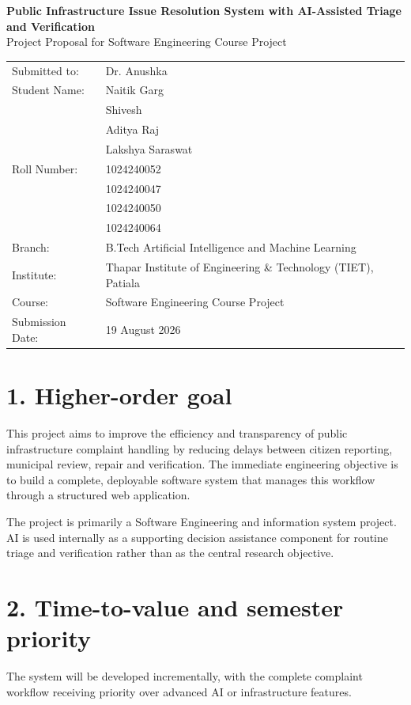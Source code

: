\documentclass[12pt,a4paper]{article}
\begin{document}
\begin{center}
{\Large\bfseries Public Infrastructure Issue Resolution System with AI-Assisted Triage and Verification}\\[6pt]
{\normalsize Project Proposal for Software Engineering Course Project}\\[12pt]
\begin{tabular}{@{}ll@{}}
Submitted to: & Dr. Anushka \\[2pt]
Student Name: & Naitik Garg \\ 
              & Shivesh \\
              & Aditya Raj \\
              & Lakshya Saraswat \\[2pt]
Roll Number:  & 1024240052 \\
              & 1024240047 \\
              & 1024240050 \\
              & 1024240064 \\[2pt]
Branch: & B.Tech Artificial Intelligence and Machine Learning \\[2pt]
Institute: & Thapar Institute of Engineering \& Technology (TIET), Patiala \\[2pt]
Course: & Software Engineering Course Project \\[2pt]
Submission Date: & 19 August 2026
\end{tabular}
\end{center}
\vspace{6pt}

\vspace{6pt}

\section{1. Higher-order goal}
This project aims to improve the efficiency and transparency of public infrastructure complaint handling by reducing delays between citizen reporting, municipal review, repair and verification. The immediate engineering objective is to build a complete, deployable software system that manages this workflow through a structured web application.

The project is primarily a Software Engineering and information system project. AI is used internally as a supporting decision assistance component for routine triage and verification rather than as the central research objective.

\section{2. Time-to-value and semester priority}
The system will be developed incrementally, with the complete complaint workflow receiving priority over advanced AI or infrastructure features.
\end{document}
